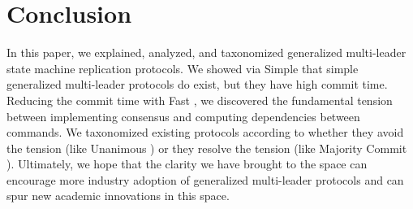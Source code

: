 


\section{Conclusion}
In this paper, we explained, analyzed, and taxonomized generalized multi-leader
state machine replication protocols.
%
%
We showed via Simple \BPaxos{} that simple generalized multi-leader protocols
do exist, but they have high commit time.  Reducing the commit time with Fast
\BPaxos{}, we discovered the fundamental tension between implementing consensus
and computing dependencies between commands. We taxonomized existing protocols
according to whether they avoid the tension (like Unanimous \BPaxos{}) or they
resolve the tension (like Majority Commit \BPaxos{}). Ultimately, we hope that
the clarity we have brought to the space can encourage more industry adoption
of generalized multi-leader protocols and can spur new academic innovations in
this space.
